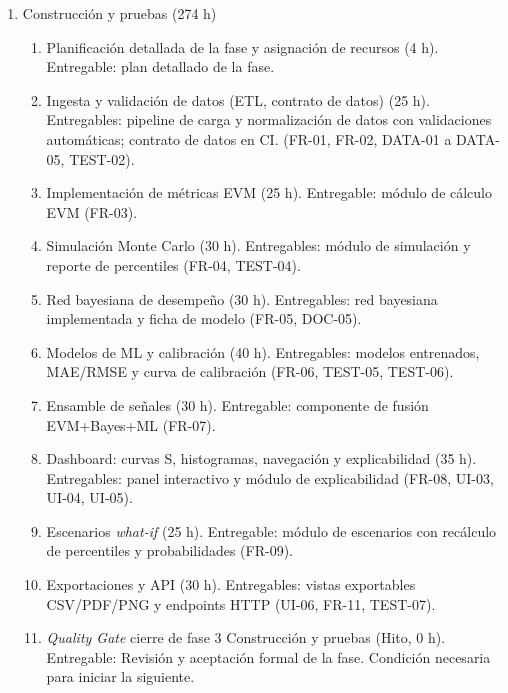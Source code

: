 \documentclass[12pt]
{charter}
\begin{document}
\begin{enumerate}
  \item Construcción y pruebas (274 h)
    \begin{enumerate}[label*=\arabic*., ref=\theenumi.\arabic*]
      \item Planificación detallada de la fase y asignación de recursos (4 h). Entregable: plan detallado de la fase.
      \item Ingesta y validación de datos (ETL, contrato de datos) (25 h). Entregables: pipeline de carga y normalización de datos con validaciones automáticas; contrato de datos en CI. (FR-01, FR-02, DATA-01 a DATA-05, TEST-02).
      \item Implementación de métricas EVM (25 h). Entregable: módulo de cálculo EVM (FR-03).
      \item Simulación Monte Carlo (30 h). Entregables: módulo de simulación y reporte de percentiles (FR-04, TEST-04).
      \item Red bayesiana de desempeño (30 h). Entregables: red bayesiana implementada y ficha de modelo (FR-05, DOC-05).
      \item Modelos de ML y calibración (40 h). Entregables: modelos entrenados, MAE/RMSE y curva de calibración (FR-06, TEST-05, TEST-06).
      \item Ensamble de señales (30 h). Entregable: componente de fusión EVM+Bayes+ML (FR-07).
      \item Dashboard: curvas S, histogramas, navegación y explicabilidad (35 h). Entregables: panel interactivo y módulo de explicabilidad (FR-08, UI-03, UI-04, UI-05).
      \item Escenarios \textit{what-if} (25 h). Entregable: módulo de escenarios con recálculo de percentiles y probabilidades (FR-09).
      \item Exportaciones y API (30 h). Entregables: vistas exportables CSV/PDF/PNG y endpoints HTTP (UI-06, FR-11, TEST-07).
      \item \textit{Quality Gate} cierre de fase 3 Construcción y pruebas (Hito, 0 h). Entregable: Revisión y aceptación formal de la fase. Condición necesaria para iniciar la siguiente.
    \end{enumerate}


\end{enumerate}
\end{document}

